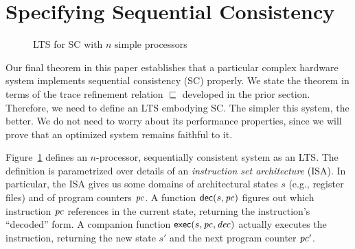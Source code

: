 \section{Specifying Sequential Consistency}\label{sec:sc}

\begin{figure}
\small
\centering
\begin{boxedminipage}[c]{.48\textwidth}
{}
{}

{}

{}

{}
\end{boxedminipage}
\caption{LTS for SC with $n$ simple processors}
\label{Ref}
\end{figure}

Our final theorem in this paper establishes that a particular complex hardware
system implements sequential consistency (SC) properly.  We state the theorem
in terms of the trace refinement relation $\sqsubseteq$ developed in the prior
section.  Therefore, we need to define an LTS embodying SC.  The simpler this
system, the better.  We do not need to worry about its performance properties,
since we will prove that an optimized system remains faithful to it.

Figure~\ref{Ref} defines an $n$-processor, sequentially consistent system as an
LTS.  The definition is parametrized over details of an \emph{instruction set
architecture} (ISA).  In particular, the ISA gives us some domains of
architectural states $s$ (e.g., register files) and of program counters $\mathit{pc}$.
A function $\mathsf{dec}(s, \mathit{pc})$ figures out which instruction $\mathit{pc}$ references in the
current state, returning the instruction's ``decoded'' form.  A companion
function $\mathsf{exec}(s, \mathit{pc}, \mathit{dec})$ actually executes the instruction,
returning the new state $s'$ and the next program counter $\mathit{pc}'$.

